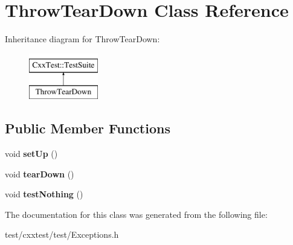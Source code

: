 \hypertarget{classThrowTearDown}{\section{Throw\-Tear\-Down Class Reference}
\label{classThrowTearDown}
}
Inheritance diagram for Throw\-Tear\-Down\-:\begin{figure}[H]
\begin{center}
\leavevmode
\includegraphics[height=2.000000cm]{classThrowTearDown}
\end{center}
\end{figure}
\subsection*{Public Member Functions}
\begin{DoxyCompactItemize}
\item 
\hypertarget{classThrowTearDown_adff02cbbc118a9a0c28d292835339d24}{void {\bfseries set\-Up} ()}\label{classThrowTearDown_adff02cbbc118a9a0c28d292835339d24}

\item 
\hypertarget{classThrowTearDown_ad860cd35f9c86703f344321fd1968338}{void {\bfseries tear\-Down} ()}\label{classThrowTearDown_ad860cd35f9c86703f344321fd1968338}

\item 
\hypertarget{classThrowTearDown_a90da5ef0b6f4fd9e5e5a45759d51c32a}{void {\bfseries test\-Nothing} ()}\label{classThrowTearDown_a90da5ef0b6f4fd9e5e5a45759d51c32a}

\end{DoxyCompactItemize}


The documentation for this class was generated from the following file\-:\begin{DoxyCompactItemize}
\item 
test/cxxtest/test/Exceptions.\-h\end{DoxyCompactItemize}
